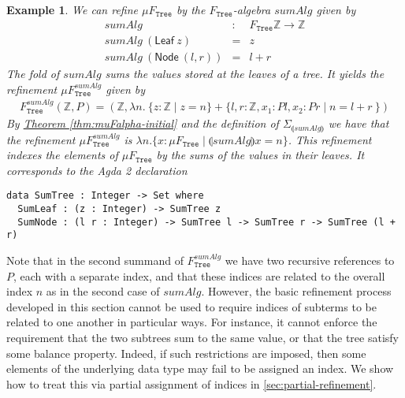 \documentclass{LMCS}
\newcommand{\tyname}[1]{\texttt{#1}}
\newcommand{\sepbar}{\mathrel|}
\newcommand{\fold}[1]{\llparenthesis #1 \rrparenthesis}
\newtheorem{eorollary}{Example}
\newcommand{\thmref}[1]{\hyperref[#1]{Theorem \ref*{#1}}}
\begin{document}
\begin{eorollary}\label{ex:refined-trees}
  We can refine $\mu F_{\tyname{Tree}}$ by the
  $F_{\tyname{Tree}}$-algebra $\mathit{sumAlg}$ given by
\begin{displaymath}
  \begin{array}{lcl}
    \mathit{sumAlg} & : & F_{\tyname{Tree}}\mathbb{Z} \to \mathbb{Z} \\
    \mathit{sumAlg}\ (\mathsf{Leaf}\ z) & = & z \\
    \mathit{sumAlg}\ (\mathsf{Node}\ (l,r)) & = & l + r
  \end{array}
\end{displaymath}
The fold of $\mathit{sumAlg}$ sums the values stored at the leaves of
a tree. It yields the refinement $\mu
F_{\tyname{Tree}}^{\mathit{sumAlg}}$ given by
\begin{eqnarray*}
  F_{\tyname{Tree}}^{\mathit{sumAlg}}(\mathbb{Z}, P) 
  = (\mathbb{Z}, \lambda n.\ \{z : \mathbb{Z} \sepbar z = n\} + \{ l, r
  : \mathbb{Z}, x_1 : P l, x_2 : P r \sepbar n = l + r\ \})
\end{eqnarray*}
By \thmref{thm:muFalpha-initial} and the definition of
$\Sigma_{\fold{\mathit{sumAlg}}}$ we have that the refinement $\mu
F_{\tyname{Tree}}^{\mathit{sumAlg}}$ is $\lambda n. \{ x : \mu
F_{\tyname{Tree}} \sepbar \fold{\mathit{sumAlg}}x = n \}$. This
refinement indexes the elements of $\mu F_{\tyname{Tree}}$ by the sums
of the values in their leaves. It corresponds to the Agda 2 declaration
\begin{verbatim}
data SumTree : Integer -> Set where
  SumLeaf : (z : Integer) -> SumTree z
  SumNode : (l r : Integer) -> SumTree l -> SumTree r -> SumTree (l + r)
\end{verbatim}
\end{eorollary}

\noindent
Note that in the second summand of
$F_{\tyname{Tree}}^{\mathit{sumAlg}}$ we have two recursive references
to $P$, each with a separate index, and that these indices are related
to the overall index $n$ as in the second case of
$\mathit{sumAlg}$. However, the basic refinement process developed in
this section cannot be used to require indices of subterms to be
related to one another in particular ways. For instance, it cannot
enforce the requirement that the two subtrees sum to the same value,
or that the tree satisfy some balance property. Indeed, if such
restrictions are imposed, then some elements of the underlying data
type may fail to be assigned an index. We show how to treat this via
partial assignment of indices in \autoref{sec:partial-refinement}.
\end{document}
